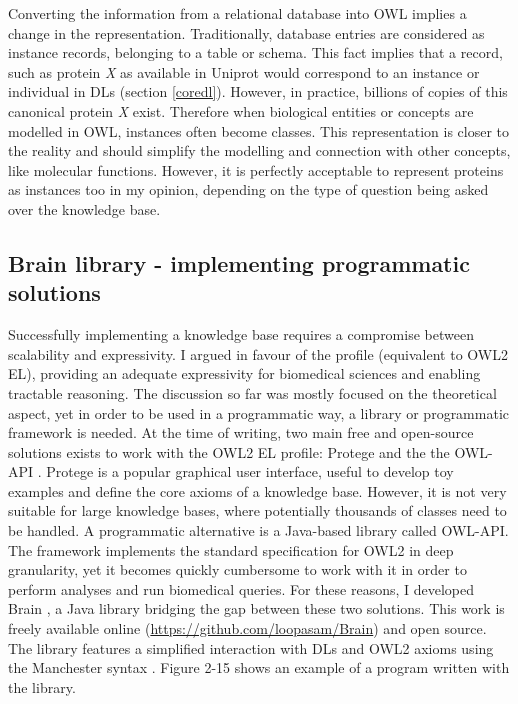 Converting the information from a relational database into OWL implies a change in the representation. Traditionally, database entries are considered as instance records, belonging to a table or schema. This fact implies that a record, such as protein \emph{X} as available in Uniprot would correspond to an instance or individual in DLs (section \ref{coredl}). However, in practice, billions of copies of this canonical protein \emph{X} exist. Therefore when biological entities or concepts are modelled in OWL, instances often become classes. This representation is closer to the reality and should simplify the modelling and connection with other concepts, like molecular functions. However, it is perfectly acceptable to represent proteins as instances too in my opinion, depending on the type of question being asked over the knowledge base.

\subsection{Brain library - implementing programmatic solutions}

Successfully implementing a knowledge base requires a compromise between scalability and expressivity. I argued in favour of the  profile (equivalent to OWL2 EL), providing an adequate expressivity for biomedical sciences and enabling tractable reasoning. The discussion so far was mostly focused on the theoretical aspect, yet in order to be used in a programmatic way, a library or programmatic framework is needed. At the time of writing, two main free and open-source solutions exists to work with the OWL2 EL profile: Protege \citep{knublauch2005protege} and the the OWL-API \citep{horridge2011owl}. Protege is a popular graphical user interface, useful to develop toy examples and define the core axioms of a knowledge base. However, it is not very suitable for large knowledge bases, where potentially thousands of classes need to be handled. A programmatic alternative is a Java-based library called OWL-API. The framework implements the standard specification for OWL2 in deep granularity, yet it becomes quickly cumbersome to work with it in order to perform analyses and run biomedical queries. For these reasons, I developed Brain \citep{croset2013brain}, a Java library bridging the gap between these two solutions. This work is freely available online (\url{https://github.com/loopasam/Brain}) and open source. The library features a simplified interaction with DLs and OWL2 axioms using the Manchester syntax \citep{horridge2006manchester}. Figure 2-15 shows an example of a program written with the library.


